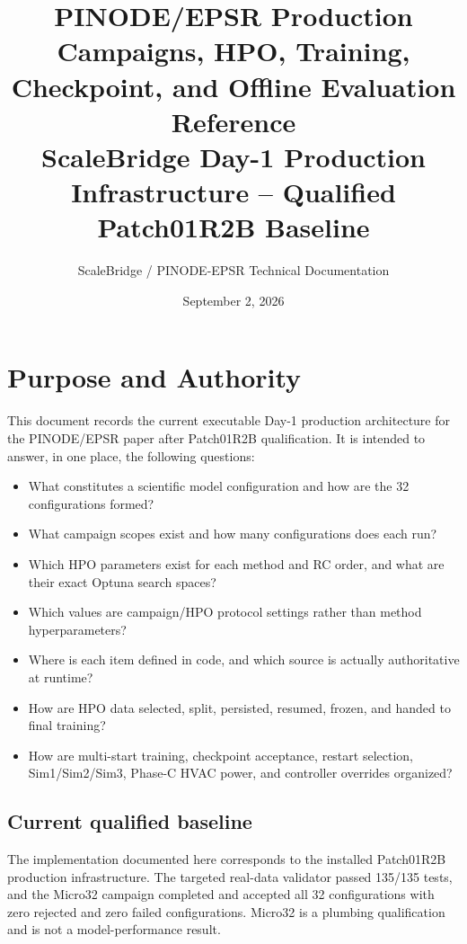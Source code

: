\documentclass[11pt]{article}
\title{\textbf{PINODE/EPSR Production Campaigns, HPO, Training, Checkpoint, and Offline Evaluation Reference}\\[0.4em]
\large ScaleBridge Day-1 Production Infrastructure -- Qualified Patch01R2B Baseline}
\author{ScaleBridge / PINODE-EPSR Technical Documentation}
\date{September 2, 2026}
\begin{document}
\maketitle
\tableofcontents
\newpage

\section{Purpose and Authority}
This document records the current executable Day-1 production architecture for the PINODE/EPSR paper after Patch01R2B qualification. It is intended to answer, in one place, the following questions:
\begin{itemize}[nosep]
  \item What constitutes a scientific model configuration and how are the 32 configurations formed?
  \item What campaign scopes exist and how many configurations does each run?
  \item Which HPO parameters exist for each method and RC order, and what are their exact Optuna search spaces?
  \item Which values are campaign/HPO protocol settings rather than method hyperparameters?
  \item Where is each item defined in code, and which source is actually authoritative at runtime?
  \item How are HPO data selected, split, persisted, resumed, frozen, and handed to final training?
  \item How are multi-start training, checkpoint acceptance, restart selection, Sim1/Sim2/Sim3, Phase-C HVAC power, and controller overrides organized?
\end{itemize}

\subsection{Current qualified baseline}
The implementation documented here corresponds to the installed Patch01R2B production infrastructure. The targeted real-data validator passed 135/135 tests, and the Micro32 campaign completed and accepted all 32 configurations with zero rejected and zero failed configurations. Micro32 is a plumbing qualification and is not a model-performance result.
\end{document}
